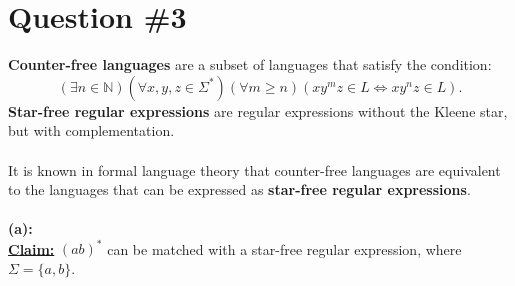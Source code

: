\documentclass[12pt]{article}
\begin{document}
\section*{Question \#3}
\textbf{Counter-free languages} are a subset of languages that satisfy the condition:
\[
    (\exists n \in \mathbb{N})(\forall x, y, z \in \Sigma^*)(\forall m \geq n)(xy^mz \in L \iff xy^nz \in L) \text{.}
\]
\textbf{Star-free regular expressions} are regular expressions without the Kleene star, but with complementation. \\
\\
It is known in formal language theory that counter-free languages are equivalent to the languages that can be expressed as \textbf{star-free regular expressions}. \\
\\
\textbf{(a):} \\
\textbf{\underline{Claim:}} $(ab)^*$ can be matched with a star-free regular expression, where $\Sigma = \{ a, b \}$.
\end{document}
